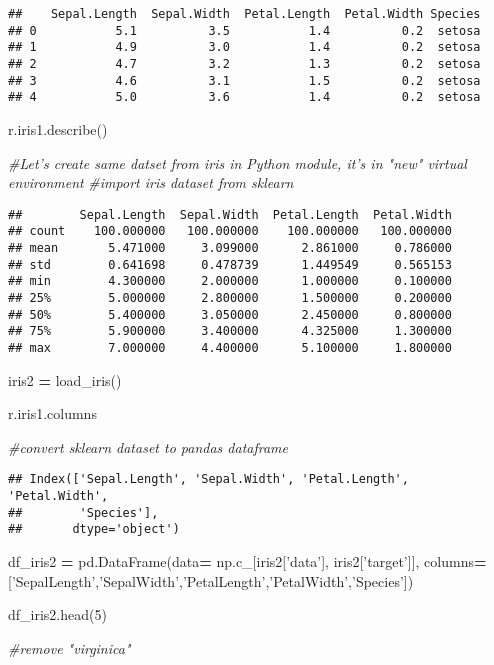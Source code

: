 \documentclass[]{article}
\newenvironment{Shaded}{\begin{snugshade}}{\end{snugshade}}
\newcommand{\CommentTok}[1]{\textcolor[rgb]{0.56,0.35,0.01}{\textit{#1}}}
\newcommand{\DecValTok}[1]{\textcolor[rgb]{0.00,0.00,0.81}{#1}}
\newcommand{\NormalTok}[1]{#1}
\newcommand{\OperatorTok}[1]{\textcolor[rgb]{0.81,0.36,0.00}{\textbf{#1}}}
\newcommand{\StringTok}[1]{\textcolor[rgb]{0.31,0.60,0.02}{#1}}
\begin{document}
\begin{verbatim}
##    Sepal.Length  Sepal.Width  Petal.Length  Petal.Width Species
## 0           5.1          3.5           1.4          0.2  setosa
## 1           4.9          3.0           1.4          0.2  setosa
## 2           4.7          3.2           1.3          0.2  setosa
## 3           4.6          3.1           1.5          0.2  setosa
## 4           5.0          3.6           1.4          0.2  setosa
\end{verbatim}

\begin{Shaded}
\begin{Highlighting}[]
\NormalTok{r.iris1.describe()}

\CommentTok{#Let's create same datset from iris in Python module, it's in "new" virtual environment}
\CommentTok{#import iris dataset from sklearn}
\end{Highlighting}
\end{Shaded}

\begin{verbatim}
##        Sepal.Length  Sepal.Width  Petal.Length  Petal.Width
## count    100.000000   100.000000    100.000000   100.000000
## mean       5.471000     3.099000      2.861000     0.786000
## std        0.641698     0.478739      1.449549     0.565153
## min        4.300000     2.000000      1.000000     0.100000
## 25%        5.000000     2.800000      1.500000     0.200000
## 50%        5.400000     3.050000      2.450000     0.800000
## 75%        5.900000     3.400000      4.325000     1.300000
## max        7.000000     4.400000      5.100000     1.800000
\end{verbatim}

\begin{Shaded}
\begin{Highlighting}[]
\NormalTok{iris2 }\OperatorTok{=}\NormalTok{ load_iris()}

\NormalTok{r.iris1.columns}

\CommentTok{#convert sklearn dataset to pandas dataframe}
\end{Highlighting}
\end{Shaded}

\begin{verbatim}
## Index(['Sepal.Length', 'Sepal.Width', 'Petal.Length', 'Petal.Width',
##        'Species'],
##       dtype='object')
\end{verbatim}

\begin{Shaded}
\begin{Highlighting}[]
\NormalTok{df_iris2 }\OperatorTok{=}\NormalTok{ pd.DataFrame(data}\OperatorTok{=}\NormalTok{ np.c_[iris2[}\StringTok{'data'}\NormalTok{], iris2[}\StringTok{'target'}\NormalTok{]], columns}\OperatorTok{=}\NormalTok{ [}\StringTok{'SepalLength'}\NormalTok{,}\StringTok{'SepalWidth'}\NormalTok{,}\StringTok{'PetalLength'}\NormalTok{,}\StringTok{'PetalWidth'}\NormalTok{,}\StringTok{'Species'}\NormalTok{])}

\NormalTok{df_iris2.head(}\DecValTok{5}\NormalTok{)}

\CommentTok{#remove "virginica" }
\end{Highlighting}
\end{Shaded}
\end{document}
